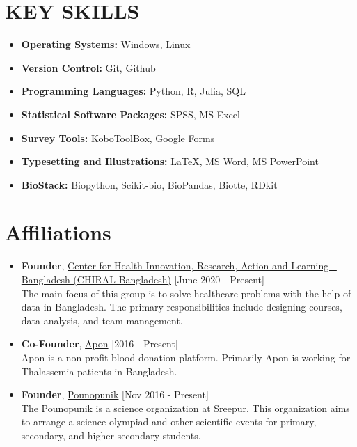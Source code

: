 \documentclass[11pt,a4paper]{moderncv}
\begin{document}
\section{KEY SKILLS}
\begin{multicols}{2}
	\begin{itemize}
		\item \textbf{Operating Systems:} Windows, Linux
		\item \textbf{Version Control:} Git, Github
	    \item \textbf{Programming Languages:} Python, R, Julia, SQL
		\item \textbf{Statistical Software Packages:} SPSS, MS Excel
		
	\end{itemize}
	\columnbreak 
	\begin{itemize}
		\item \textbf{Survey Tools:} KoboToolBox, Google Forms
		\item \textbf{Typesetting and Illustrations:} \LaTeX, MS Word, MS PowerPoint
		\item \textbf{BioStack:} Biopython, Scikit-bio, BioPandas, Biotte, RDkit
	\end{itemize}
\end{multicols} 


\section{Affiliations}
\begin{itemize}
	\item \textbf{Founder}, 
	\textcolor{blue}{\href{https://hdrobd.org/}{Center for Health Innovation, Research, Action and Learning -- Bangladesh (CHIRAL Bangladesh)}}
	\hfill [June 2020 - Present]\\ 
	The main focus of this group is to solve healthcare problems with the help 
	of data in Bangladesh. The primary responsibilities include designing 
	courses, data analysis, and team management.
	\item \textbf{Co-Founder}, 
	\textcolor{blue}{\href{}{Apon}}
	\hfill [2016 - Present]\\
	Apon is a non-profit blood donation platform. Primarily Apon is working for 
	Thalassemia patients in Bangladesh.
	\item \textbf{Founder}, 
	\textcolor{blue}{\href{}{Pounopunik}}
	\hfill [Nov 2016 - Present]\\
	The Pounopunik is a science organization at Sreepur. This organization aims 
	to arrange a science olympiad and other scientific events for primary, 
	secondary, and higher secondary students. 

\end{itemize}
\end{document}
